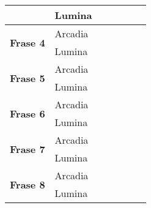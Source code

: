 \documentclass{article}
\begin{document}
\begin{landscape}
\begin{table}[]
\begin{tabular}{|ll|l|llll|}
				\multicolumn{1}{|l|}{}                                  & Lumina  &                                & \multicolumn{1}{l|}{}              & \multicolumn{1}{l|}{}             & \multicolumn{1}{l|}{}              &              \\ \hline
				\multicolumn{1}{|l|}{\multirow{2}{*}{\textbf{Frase 4}}} & Arcadia &                                & \multicolumn{1}{l|}{}              & \multicolumn{1}{l|}{}             & \multicolumn{1}{l|}{}              &              \\ \cline{2-7} 
				\multicolumn{1}{|l|}{}                                  & Lumina  &                                & \multicolumn{1}{l|}{}              & \multicolumn{1}{l|}{}             & \multicolumn{1}{l|}{}              &              \\ \hline
				\multicolumn{1}{|l|}{\multirow{2}{*}{\textbf{Frase 5}}} & Arcadia &                                & \multicolumn{1}{l|}{}              & \multicolumn{1}{l|}{}             & \multicolumn{1}{l|}{}              &              \\ \cline{2-7} 
				\multicolumn{1}{|l|}{}                                  & Lumina  &                                & \multicolumn{1}{l|}{}              & \multicolumn{1}{l|}{}             & \multicolumn{1}{l|}{}              &              \\ \hline
				\multicolumn{1}{|l|}{\multirow{2}{*}{\textbf{Frase 6}}} & Arcadia &                                & \multicolumn{1}{l|}{}              & \multicolumn{1}{l|}{}             & \multicolumn{1}{l|}{}              &              \\ \cline{2-7} 
				\multicolumn{1}{|l|}{}                                  & Lumina  &                                & \multicolumn{1}{l|}{}              & \multicolumn{1}{l|}{}             & \multicolumn{1}{l|}{}              &              \\ \hline
				\multicolumn{1}{|l|}{\multirow{2}{*}{\textbf{Frase 7}}} & Arcadia &                                & \multicolumn{1}{l|}{}              & \multicolumn{1}{l|}{}             & \multicolumn{1}{l|}{}              &              \\ \cline{2-7} 
				\multicolumn{1}{|l|}{}                                  & Lumina  &                                & \multicolumn{1}{l|}{}              & \multicolumn{1}{l|}{}             & \multicolumn{1}{l|}{}              &              \\ \hline
				\multicolumn{1}{|l|}{\multirow{2}{*}{\textbf{Frase 8}}} & Arcadia &                                & \multicolumn{1}{l|}{}              & \multicolumn{1}{l|}{}             & \multicolumn{1}{l|}{}              &              \\ \cline{2-7} 
				\multicolumn{1}{|l|}{}                                  & Lumina  &                                & \multicolumn{1}{l|}{}              & \multicolumn{1}{l|}{}             & \multicolumn{1}{l|}{}              &              \\ \hline
			\end{tabular}
		\end{table}
	\end{landscape}
\end{document}
